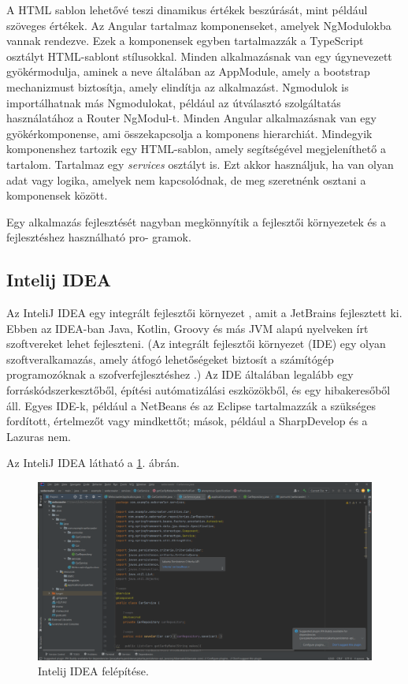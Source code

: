 A HTML sablon lehetővé teszi dinamikus értékek beszúrását, mint például szöveges értékek. Az Angular tartalmaz komponenseket, amelyek NgModulokba vannak rendezve. Ezek a komponensek egyben tartalmazzák a TypeScript osztályt HTML-sablont stílusokkal. Minden alkalmazásnak van egy úgynevezett gyökérmodulja, aminek a neve általában az AppModule, amely a bootstrap mechanizmust biztosítja, amely elindítja az alkalmazást. Ngmodulok is importálhatnak más Ngmodulokat, például az útválasztó szolgáltatás használatához a Router NgModul-t.  Minden Angular alkalmazásnak van egy gyökérkomponense, ami összekapcsolja a komponens hierarchiát. Mindegyik komponenshez tartozik egy HTML-sablon, amely segítségével megjeleníthető a tartalom. Tartalmaz egy \textit{services} osztályt is. Ezt akkor használjuk, ha van olyan adat vagy logika, amelyek nem kapcsolódnak, de meg szeretnénk osztani a komponensek között.


Egy alkalmazás fejlesztését nagyban megkönnyítik a fejlesztői környezetek és a fejlesztéshez használható pro-
gramok.
\subsection{Intelij IDEA}

Az InteliJ IDEA \cite{Intelij} egy integrált fejlesztői környezet \cite{Intelij2}, amit a JetBrains fejlesztett ki. Ebben az IDEA-ban Java, Kotlin, Groovy és más JVM alapú nyelveken írt szoftvereket lehet fejleszteni. (Az integrált fejlesztői környezet (IDE)  egy olyan  szoftveralkamazás, amely átfogó lehetőségeket biztosít a számítógép programozóknak a szofverfejlesztéshez .) Az IDE általában legalább egy forráskódszerkesztőből, építési autómatizálási eszközökből, és egy hibakeresőből áll. Egyes IDE-k, például a NetBeans és az Eclipse tartalmazzák a szükséges fordított, értelmezőt vagy mindkettőt; mások, például a SharpDevelop és a Lazuras nem.

Az InteliJ IDEA látható a \ref{fig:Intelij}. ábrán.

\begin{figure}[h]
\centering
\includegraphics[scale=1]{images/Intelij.png}
\caption{Intelij IDEA felépítése.}
\label{fig:Intelij}
\end{figure}

